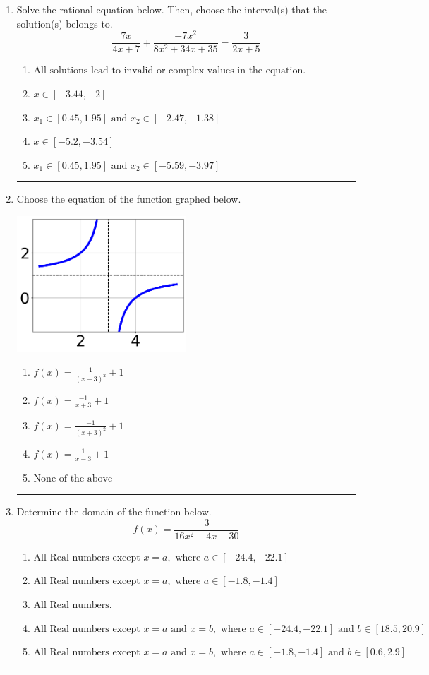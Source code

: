 \documentclass[14pt]{extbook}
\newcommand{\litem}[1]{\item#1\hspace*{-1cm}\rule{\textwidth}{0.4pt}}
\begin{document}
\begin{enumerate}
{\begin{enumerate}[label=\Alph*.]
\end{enumerate} }
\litem{
Solve the rational equation below. Then, choose the interval(s) that the solution(s) belongs to.\[ \frac{7x}{4x + 7} + \frac{-7x^{2}}{8x^{2} +34 x + 35} = \frac{3}{2x + 5} \]\begin{enumerate}[label=\Alph*.]
\item \( \text{All solutions lead to invalid or complex values in the equation.} \)
\item \( x \in [-3.44,-2] \)
\item \( x_1 \in [0.45, 1.95] \text{ and } x_2 \in [-2.47,-1.38] \)
\item \( x \in [-5.2,-3.54] \)
\item \( x_1 \in [0.45, 1.95] \text{ and } x_2 \in [-5.59,-3.97] \)

\end{enumerate} }
\litem{
Choose the equation of the function graphed below.
\begin{center}
    \includegraphics[width=0.5\textwidth]{../Figures/rationalGraphToEquationCopyA.png}
\end{center}
\begin{enumerate}[label=\Alph*.]
\item \( f(x) = \frac{1}{(x - 3)^2} + 1 \)
\item \( f(x) = \frac{-1}{x + 3} + 1 \)
\item \( f(x) = \frac{-1}{(x + 3)^2} + 1 \)
\item \( f(x) = \frac{1}{x - 3} + 1 \)
\item \( \text{None of the above} \)

\end{enumerate} }
\litem{
Determine the domain of the function below.\[ f(x) = \frac{3}{16x^{2} +4 x -30} \]\begin{enumerate}[label=\Alph*.]
\item \( \text{All Real numbers except } x = a, \text{ where } a \in [-24.4, -22.1] \)
\item \( \text{All Real numbers except } x = a, \text{ where } a \in [-1.8, -1.4] \)
\item \( \text{All Real numbers.} \)
\item \( \text{All Real numbers except } x = a \text{ and } x = b, \text{ where } a \in [-24.4, -22.1] \text{ and } b \in [18.5, 20.9] \)
\item \( \text{All Real numbers except } x = a \text{ and } x = b, \text{ where } a \in [-1.8, -1.4] \text{ and } b \in [0.6, 2.9] \)


\end{enumerate}}
\end{enumerate}
\end{document}

